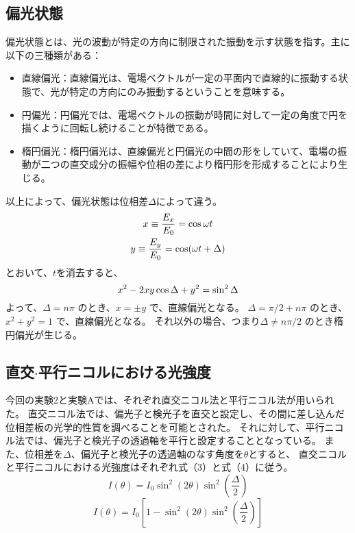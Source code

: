 \documentclass{article}
\begin{document}
\subsection{偏光状態}
\begin{spacing}{1.2} %
    \noindent %
    偏光状態とは、光の波動が特定の方向に制限された振動を示す状態を指す。主に以下の三種類がある：
    \begin{itemize}
        \item 直線偏光：直線偏光は、電場ベクトルが一定の平面内で直線的に振動する状態で、光が特定の方向にのみ振動するということを意味する。
        \item 円偏光：円偏光では、電場ベクトルの振動が時間に対して一定の角度で円を描くように回転し続けることが特徴である。
        \item 楕円偏光：楕円偏光は、直線偏光と円偏光の中間の形をしていて、電場の振動が二つの直交成分の振幅や位相の差により楕円形を形成することにより生じる。
    \end{itemize}

    \noindent
    以上によって、偏光状態は位相差$\Delta$によって違う。
    \begin{equation}
        \begin{gathered}
        x \equiv \frac{E_x}{E_0}=\cos \omega t \\
        y \equiv \frac{E_y}{E_0}=\cos (\omega t+\Delta) \notag
        \end{gathered}
    \end{equation}
    とおいて、$t$を消去すると、
    \begin{equation}
        x^2-2 x y \cos \Delta+y^2=\sin ^2 \Delta \notag
    \end{equation}
    よって、$\Delta = n\pi$ のとき、$x = \pm y$ で、直線偏光となる。
    $\Delta = \pi/2 + n\pi$ のとき、$x^2 + y^2 = 1$ で、直線偏光となる。
    それ以外の場合、つまり$\Delta \not= n\pi/2$ のとき楕円偏光が生じる。
\end{spacing}

\subsection{直交$\cdot$平行ニコルにおける光強度}
\begin{spacing}{1.2}
    今回の実験2と実験Aでは、それぞれ直交ニコル法と平行ニコル法が用いられた。
    直交ニコル法では、偏光子と検光子を直交と設定し、その間に差し込んだ位相差板の光学的性質を調べることを可能とされた。
    それに対して、平行ニコル法では、偏光子と検光子の透過軸を平行と設定することとなっている。
    また、位相差を$\Delta$、偏光子と検光子の透過軸のなす角度を$\theta$とすると、
    直交ニコルと平行ニコルにおける光強度はそれぞれ式（3）と式（4）に従う。
    \begin{equation}
        I(\theta) = I_0 \sin^2(2\theta) \sin^2\left(\frac{\Delta}{2}\right)
    \end{equation}
    \begin{equation}
        I(\theta) = I_0 \left[ 1 - \sin^2(2\theta) \sin^2\left(\frac{\Delta}{2}\right) \right]
    \end{equation}
\end{spacing}
\end{document}
